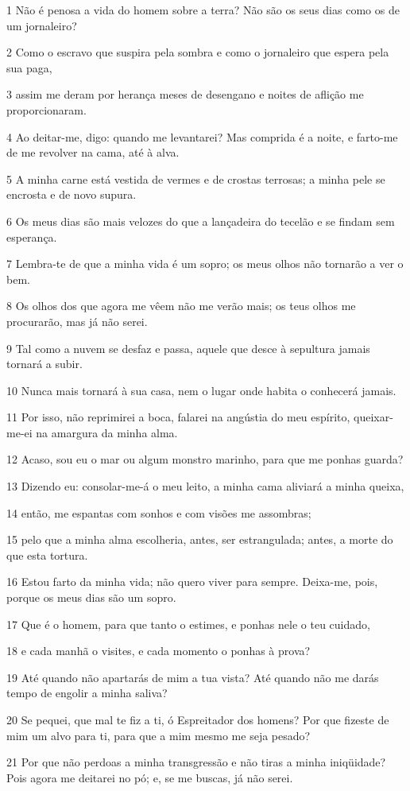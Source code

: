 \par 1 Não é penosa a vida do homem sobre a terra? Não são os seus dias como os de um jornaleiro?
\par 2 Como o escravo que suspira pela sombra e como o jornaleiro que espera pela sua paga,
\par 3 assim me deram por herança meses de desengano e noites de aflição me proporcionaram.
\par 4 Ao deitar-me, digo: quando me levantarei? Mas comprida é a noite, e farto-me de me revolver na cama, até à alva.
\par 5 A minha carne está vestida de vermes e de crostas terrosas; a minha pele se encrosta e de novo supura.
\par 6 Os meus dias são mais velozes do que a lançadeira do tecelão e se findam sem esperança.
\par 7 Lembra-te de que a minha vida é um sopro; os meus olhos não tornarão a ver o bem.
\par 8 Os olhos dos que agora me vêem não me verão mais; os teus olhos me procurarão, mas já não serei.
\par 9 Tal como a nuvem se desfaz e passa, aquele que desce à sepultura jamais tornará a subir.
\par 10 Nunca mais tornará à sua casa, nem o lugar onde habita o conhecerá jamais.
\par 11 Por isso, não reprimirei a boca, falarei na angústia do meu espírito, queixar-me-ei na amargura da minha alma.
\par 12 Acaso, sou eu o mar ou algum monstro marinho, para que me ponhas guarda?
\par 13 Dizendo eu: consolar-me-á o meu leito, a minha cama aliviará a minha queixa,
\par 14 então, me espantas com sonhos e com visões me assombras;
\par 15 pelo que a minha alma escolheria, antes, ser estrangulada; antes, a morte do que esta tortura.
\par 16 Estou farto da minha vida; não quero viver para sempre. Deixa-me, pois, porque os meus dias são um sopro.
\par 17 Que é o homem, para que tanto o estimes, e ponhas nele o teu cuidado,
\par 18 e cada manhã o visites, e cada momento o ponhas à prova?
\par 19 Até quando não apartarás de mim a tua vista? Até quando não me darás tempo de engolir a minha saliva?
\par 20 Se pequei, que mal te fiz a ti, ó Espreitador dos homens? Por que fizeste de mim um alvo para ti, para que a mim mesmo me seja pesado?
\par 21 Por que não perdoas a minha transgressão e não tiras a minha iniqüidade? Pois agora me deitarei no pó; e, se me buscas, já não serei.

